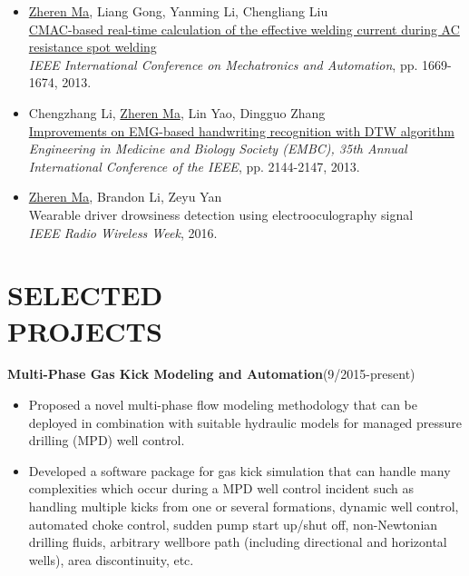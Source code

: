 \documentclass[margin, 9pt]{res} %
\begin{document}
\begin{resume}
\begin{itemize}[leftmargin=*]
	\item \underline{Zheren Ma}, Liang Gong, Yanming Li, Chengliang Liu\\
          \href{http://ieeexplore.ieee.org/xpl/login.jsp?tp=&arnumber=6618166&url=http\%3A\%2F\%2Fieeexplore.ieee.org\%2Fxpls\%2Fabs_all.jsp\%3Farnumber\%3D6618166}
          {CMAC-based real-time calculation of the effective welding current during AC resistance spot welding}\\
          \textit{IEEE International Conference on Mechatronics and Automation}, pp. 1669-1674, 2013.

	\item Chengzhang Li, \underline{Zheren Ma}, Lin Yao, Dingguo Zhang\\
          \href{http://ieeexplore.ieee.org/xpl/login.jsp?tp=&arnumber=6609958&url=http\%3A\%2F\%2Fieeexplore.ieee.org\%2Fiel7\%2F6596169\%2F6609410\%2F06609958.pdf\%3Farnumber\%3D6609958}
          {Improvements on EMG-based handwriting recognition with DTW algorithm}\\
          \textit{Engineering in Medicine and Biology Society (EMBC), 35th Annual International Conference of the IEEE}, pp. 2144-2147, 2013.

    \item \underline{Zheren Ma}, Brandon Li, Zeyu Yan\\
          {Wearable driver drowsiness detection using electrooculography signal}\\
          \textit{IEEE Radio Wireless Week}, 2016.
\end{itemize}


\section{SELECTED\\ PROJECTS}
{\large\textbf{Multi-Phase Gas Kick Modeling and Automation}}\hfill(9/2015-present)\\
\vspace*{-10pt}
\begin{itemize}[leftmargin=*] \itemsep -3pt
\vspace*{-5pt}
	\item Proposed a novel multi-phase flow modeling methodology that can be deployed in combination with suitable hydraulic models for managed pressure drilling (MPD) well control.
	\item Developed a software package for gas kick simulation that can handle many complexities which occur during a MPD well control incident such as handling multiple kicks from one or several formations, dynamic well control, automated choke control, sudden pump start up/shut off, non-Newtonian drilling fluids, arbitrary wellbore path (including directional and horizontal wells), area discontinuity, etc.
\end{itemize}


\end{resume}
\end{document}
